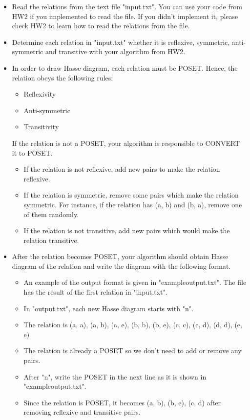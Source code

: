 \documentclass[a4 paper]{article}
\numberwithin{equation}{section}
\newcommand{\0}{\mathbf{0}}
\begin{document}
\begin{itemize}
	\item Read the relations from the text file "input.txt". You can use your code from HW2 if you implemented to read the file. If you didn't implement it, please check HW2 to learn how to read the relations from the file. 
	\item Determine each relation in "input.txt" whether it is reflexive, symmetric, anti-symmetric and transitive with your algorithm from HW2.
	\item In order to draw Hasse diagram, each relation must be POSET. Hence, the relation obeys the following rules:
	
	\begin{itemize}
		\item Reflexivity
		\item Anti-symmetric
		\item Transitivity 
	\end{itemize}
	If the relation is not a POSET, your algorithm is responsible to CONVERT it to POSET. 
	\begin{itemize}
		\item If the relation is not reflexive, add new pairs to make the relation reflexive.
		\item If the relation is symmetric, remove some pairs which make the relation symmetric. For instance, if the relation has (a, b) and (b, a), remove one of them randomly.
		\item If the relation is not transitive, add new pairs which would make the relation transitive. 
	\end{itemize}
	\item After the relation becomes POSET, your algorithm should obtain Hasse diagram of the relation and write the diagram with the following format. 
	\begin{itemize}
		\item An example of the output format is given in "exampleoutput.txt". The file has the result of the first relation in "input.txt".
		\item In "output.txt", each new Hasse diagram starts with "n".
		\item The relation is (a, a), (a, b), (a, e), (b, b), (b, e), (c, c), (c, d), (d, d), (e, e)
		\item The relation is already a POSET so we don't need to add or remove any pairs.
		\item After "n", write the POSET in the next line as it is shown in "exampleoutput.txt".
		\item Since the relation is POSET, it becomes (a, b), (b, e), (c, d) after removing reflexive and transitive pairs. 

\end{itemize}
\end{itemize}
\end{document}
